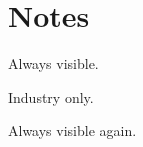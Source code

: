 \hypertarget{notes}{%
\section{Notes}\label{notes}}

Always visible.

Industry only.

Always visible again.

